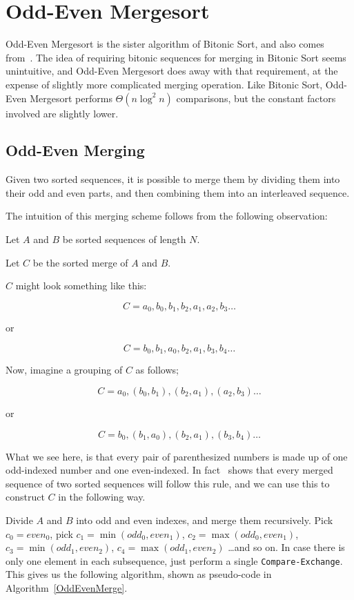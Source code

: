 \FloatBarrier
\section{Odd-Even Mergesort} 
\label{sec:OddEvenMergesort}

Odd-Even Mergesort is the sister algorithm of Bitonic Sort, and also comes from~. The idea of requiring bitonic sequences for merging in  Bitonic Sort seems unintuitive, and Odd-Even Mergesort does away with that requirement, at the expense of slightly more complicated merging operation.
Like Bitonic Sort, Odd-Even Mergesort performs $\Theta(n \log^2 n)$ comparisons, but the constant factors involved are slightly lower.

\subsection{Odd-Even Merging}

Given two sorted sequences, it is possible to merge them by dividing them into their odd and even parts, and then combining them into an interleaved sequence.

The intuition of this merging scheme follows from the following observation:

\noindent
Let $A$ and $B$ be sorted sequences of length $N$.

\noindent
Let $C$ be the sorted merge of $A$ and $B$.

$C$ might look something like this:

\[
C = {a_0, b_0, b_1, b_2, a_1, a_2, b_3 \dots}
\]

or

\[
C = {b_0, b_1, a_0, b_2, a_1, b_3, b_4 \dots}
\]

Now, imagine a grouping of $C$ as follows; 

\[
C = {a_0,(b_0, b_1), (b_2, a_1), (a_2, b_3) \dots}
\]

or

\[
C = {b_0, (b_1, a_0), (b_2, a_1), (b_3, b_4) \dots}
\]

What we see here, is that every pair of parenthesized numbers is made up of one odd-indexed number and one even-indexed. In fact~ shows that every merged sequence of two sorted sequences will follow this rule, and we can use this to construct $C$ in the following way.

Divide $A$ and $B$ into odd and even indexes, and merge them recursively. Pick $c_0 = even_0$, pick $c_1 = \min(odd_0, even_1)$, $c_2 = \max(odd_0, even_1)$, $c_3 = \min(odd_1, even_2)$, $c_4 = \max(odd_1, even_2)$ \dots and so on. In case there is only one element in each subsequence, just perform a single \texttt{Compare-Exchange}. This gives us the following algorithm, shown as pseudo-code in Algorithm~\ref{OddEvenMerge}.

